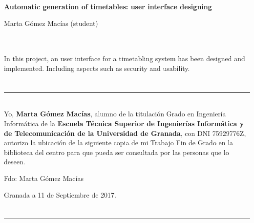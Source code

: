 \thispagestyle{empty}


\begin{center}
{\large\bfseries Automatic generation of timetables: user interface designing}\\
\end{center}
\begin{center}
Marta Gómez Macías (student)\\
\end{center}

\\

\vspace{0.7cm}
\\

In this project, an user interface for a timetabling system has been designed and implemented. Including aspects such as security and usability.

\chapter*{}
\thispagestyle{empty}

\noindent\rule[-1ex]{\textwidth}{2pt}\\[4.5ex]

Yo, \textbf{Marta Gómez Macías}, alumno de la titulación Grado en Ingeniería Informática de la \textbf{Escuela Técnica Superior
de Ingenierías Informática y de Telecomunicación de la Universidad de Granada}, con DNI 75929776Z, autorizo la
ubicación de la siguiente copia de mi Trabajo Fin de Grado en la biblioteca del centro para que pueda ser
consultada por las personas que lo deseen.

\vspace{6cm}

\noindent Fdo: Marta Gómez Macías

\vspace{2cm}

\begin{flushright}
Granada a 11 de Septiembre de 2017.
\end{flushright}


\chapter*{}
\thispagestyle{empty}

\noindent\rule[-1ex]{\textwidth}{2pt}\\[4.5ex]


